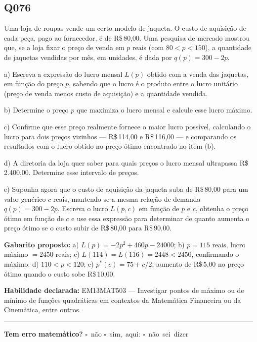 \documentclass[11pt,a4paper]{article}
\begin{document}
\begin{samepage}
\subsection*{Q076}
Uma loja de roupas vende um certo modelo de jaqueta. O custo de aquisição de cada peça, pago ao fornecedor, é de R\$\,80,00. Uma pesquisa de mercado mostrou que, se a loja fixar o preço de venda em $p$ reais (com $80 < p < 150$), a quantidade de jaquetas vendidas por mês, em unidades, é dada por $q(p) = 300 - 2p$.

a) Escreva a expressão do lucro mensal $L(p)$ obtido com a venda das jaquetas, em função do preço $p$, sabendo que o lucro é o produto entre o lucro unitário (preço de venda menos custo de aquisição) e a quantidade vendida.

b) Determine o preço $p$ que maximiza o lucro mensal e calcule esse lucro máximo.

c) Confirme que esse preço realmente fornece o maior lucro possível, calculando o lucro para dois preços vizinhos — R\$\,114,00 e R\$\,116,00 — e comparando os resultados com o lucro obtido no preço ótimo encontrado no item (b).

d) A diretoria da loja quer saber para quais preços o lucro mensal ultrapassa R\$\,2.400,00. Determine esse intervalo de preços.

e) Suponha agora que o custo de aquisição da jaqueta suba de R\$\,80,00 para um valor genérico $c$ reais, mantendo-se a mesma relação de demanda $q(p) = 300-2p$. Escreva o lucro $L(p,c)$ em função de $p$ e $c$, obtenha o preço ótimo em função de $c$ e use essa expressão para determinar de quanto aumenta o preço ótimo se o custo subir de R\$\,80,00 para R\$\,90,00.

\textbf{Gabarito proposto:} a) $L(p) = -2p^2+460p-24000$; b) $p=115$ reais, lucro máximo $= 2450$ reais; c) $L(114)=L(116)=2448 < 2450$, confirmando o máximo; d) $110 < p < 120$; e) $p^*(c) = 75 + c/2$; aumento de R\$\,5,00 no preço ótimo quando o custo sobe R\$\,10,00.

\textbf{Habilidade declarada:} EM13MAT503 --- Investigar pontos de máximo ou de mínimo de funções quadráticas em contextos da Matemática Financeira ou da Cinemática, entre outros.
\end{samepage}

\noindent\rule{\linewidth}{0.4pt}
\textbf{Tem erro matemático?}\quad
\mbox{$\square$~não} \quad \mbox{$\square$~sim, aqui:} \underline{\hspace{5cm}}
\quad \mbox{$\square$~não sei dizer}
\end{document}
